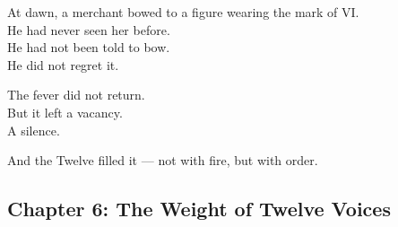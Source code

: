 \documentclass[9pt]{article}
\begin{document}
\vspace{1em}

At dawn, a merchant bowed to a figure wearing the mark of VI.\\
He had never seen her before.\\
He had not been told to bow.\\
He did not regret it.

\vspace{1em}

The fever did not return.\\
But it left a vacancy.\\
A silence.

And the Twelve filled it — not with fire, but with order.

\newpage

\subsection*{Chapter 6: The Weight of Twelve Voices}

\vspace{1in}
\end{document}
